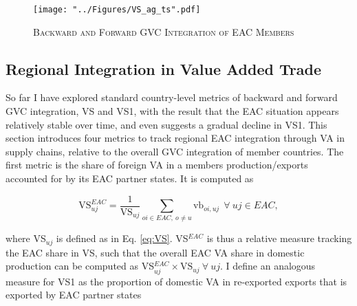 \documentclass[a4paper]{article}
\begin{document}
\begin{figure}[h!]
\centering
\caption{\label{fig:VSag_ts}\textsc{Backward and Forward GVC Integration of EAC Members}}
\texttt{[image: "../Figures/VS\_ag\_ts".pdf]} %
\end{figure}
\FloatBarrier







\subsection{Regional Integration in Value Added Trade}

So far I have explored standard country-level metrics of backward and forward GVC integration, VS and VS1, with the result that the EAC situation appears relatively stable over time, and even suggests a gradual decline in VS1. This section introduces four metrics to track regional EAC integration through VA in supply chains, relative to the overall GVC integration of member countries. The first metric is the share of foreign VA in a members production/exports accounted for by its EAC partner states. It is computed as

\begin{equation} \label{eq:VS_EAC}
\text{VS}_{uj}^{EAC} = \frac{1}{\text{VS}_{uj}}  \sum_{oi \in EAC,\ o \neq  u} \text{vb}_{oi, uj}   \ \ \forall\ uj \in EAC,
\end{equation}

\noindent where VS$_{uj}$ is defined as in Eq. \ref{eq:VS}. VS$^{EAC}$ is thus a relative measure tracking the EAC share in VS, such that the overall EAC VA share in domestic production can be computed as VS$_{uj}^{EAC} \times \text{VS}_{uj} \ \forall\ uj$. I define an analogous measure for VS1 as the proportion of domestic VA in re-exported exports that is exported by EAC partner states 
\end{document}
